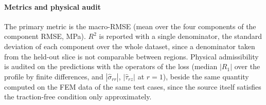 

\paragraph{Metrics and physical audit}
The primary metric is the macro-RMSE (mean over the four components of the
component RMSE, MPa). $R^2$ is reported with a single denominator, the standard
deviation of each component over the whole dataset, since a denominator taken
from the held-out slice is not comparable between regions.
Physical admissibility is audited on the predictions with the operators of the
loss (median $|R_1|$ over the profile by finite differences, and $|\hat\sigma_{rr}|$,
$|\hat\tau_{rz}|$ at $r=1$), beside the same quantity computed on the FEM
data of the same test cases, since the source itself satisfies the traction-free
condition only approximately. %

